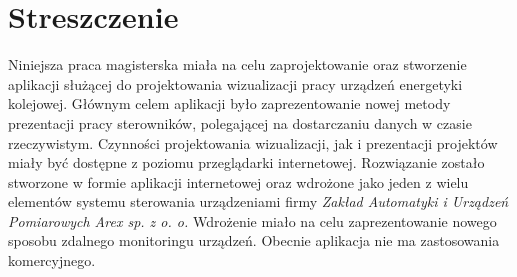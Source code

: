 \chapter*{Streszczenie}

Niniejsza praca magisterska miała na celu zaprojektowanie oraz stworzenie aplikacji służącej do projektowania wizualizacji pracy urządzeń energetyki kolejowej. Głównym celem aplikacji było zaprezentowanie nowej metody prezentacji pracy sterowników, polegającej na dostarczaniu danych w czasie rzeczywistym. Czynności projektowania wizualizacji, jak i prezentacji projektów miały być dostępne z poziomu przeglądarki internetowej.
Rozwiązanie zostało stworzone w formie aplikacji internetowej oraz wdrożone jako jeden z wielu elementów systemu sterowania urządzeniami firmy \textit{Zakład Automatyki i Urządzeń Pomiarowych Arex sp. z o. o.} Wdrożenie miało na celu zaprezentowanie nowego sposobu zdalnego monitoringu urządzeń. Obecnie aplikacja nie ma zastosowania komercyjnego.